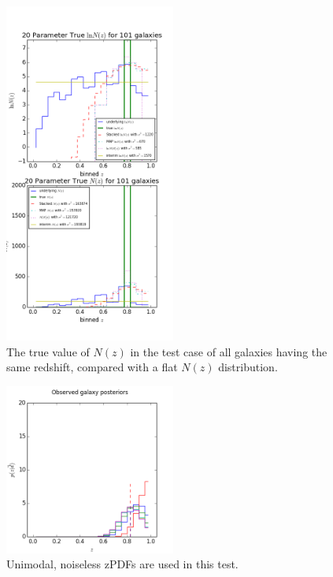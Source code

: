 \documentclass[preprint]{aastex}
\begin{document}
\begin{figure}
\includegraphics[width=0.5\textwidth]{toy/trueNz.png}
\caption{The true value of $N(z)$ in the test case of all galaxies having the same redshift, compared with a flat $N(z)$ distribution.}
\label{fig:deltatrueNz}
\end{figure}

\begin{figure}
\includegraphics[width=0.5\textwidth]{toy/samplepzs.png}
\caption{Unimodal, noiseless zPDFs are used in this test.}
\label{fig:toypzs}
\end{figure}
\end{document}

